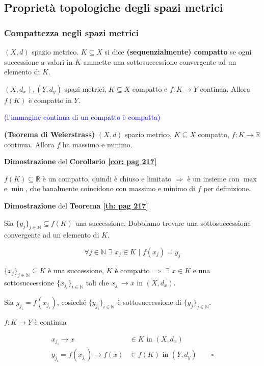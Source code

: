 \subsection{Proprietà topologiche degli spazi metrici}
\subsubsection{Compattezza negli spazi metrici}

\begin{definition}
	$(X,d)$ spazio metrico. $K \subseteq X$ si dice \textbf{(sequenzialmente) compatto} se ogni successione a valori in $K$ ammette una sottosuccessione convergente ad un elemento di $K$.
\end{definition}


\begin{theorem}
	\label{th: pag 217}
	$(X,d_x),(Y,d_y)$ spazi metrici, $K \subseteq X$ compatto e $f:K \rightarrow Y$ continua. Allora $f(K)$ è compatto in $Y$.
	
	\textcolor{blue}{(l'immagine continua di un compatto è compatta)}
\end{theorem}


\begin{corollary} \textbf{(Teorema di Weierstrass)}
	\label{cor: pag 217}
	$(X,d)$ spazio metrico, $K \subseteq X$ compatto, $f:K \rightarrow\mathbb{R}$ continua. Allora $f$ ha massimo e minimo.
\end{corollary}


\begin{dembar}
	\textbf{Dimostrazione} del \textbf{Corollario \ref{cor: pag 217}}
	
	$f(K)\subseteq \mathbb{R}$ è un compatto, quindi è chiuso e limitato $\Rightarrow$ è un insieme con $\max$ e $\min$, che banalmente coincidono con massimo e minimo di $f$ per definizione. 
\end{dembar}


\begin{dembar}
	\textbf{Dimostrazione} del \textbf{Teorema \ref{th: pag 217}}
	
	Sia $\{y_j\}_{j\in\mathbb{N}}\subseteq f(K)$ una successione. Dobbiamo trovare una sottosuccessione convergente ad un elemento di $K$.
	
	$$\forall j \in \mathbb{N} \,\,\exists\,\, x_j\in K \,\, \big| \,\, f(x_j)=y_j$$
	
	$\{x_j\}_{j \in \mathbb{N}} \subseteq K$ è una successione, $K$ è compatto $\Rightarrow \,\, \exists\,\, x \in K$ e una sottosuccessione $\{x_{j_i}\}_{i\in \mathbb{N}}$ tali che $x_{j_i}\rightarrow x$ in $(X,d_x)$.
	
	Sia $y_{j_i}=f(x_{j_i})$, cosicché $\{y_{j_i}\}_{i\in\mathbb{N}}$ è sottosuccessione di $\{y_j\}_{j\in\mathbb{N}}$.
	
	$f:K\rightarrow Y$ è continua
	
	\begin{align*} 
		x_{j_i}\rightarrow x &\in K \text{ in } (X,d_x)
		\\
		y_{j_i}=f(x_{j_i})\rightarrow f(x) &\in f(K) \text{ in } (Y,d_y) \qquad\square
	\end{align*}
\end{dembar}
	
